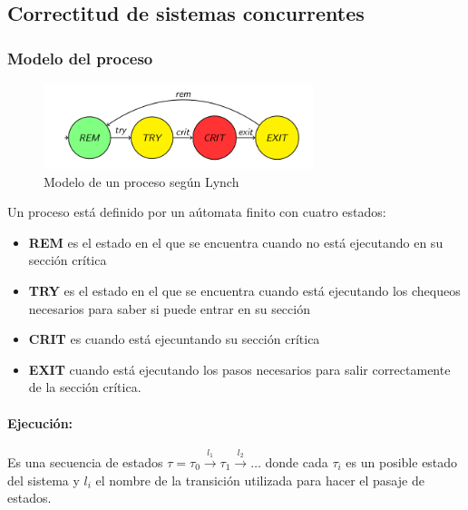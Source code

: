 \subsection{Correctitud de sistemas concurrentes}
\subsubsection{Modelo del proceso}

\begin{figure}[H]
	\centering
	\includegraphics[width=0.7\textwidth]{imagenes/modelo_proceso}
	\caption{Modelo de un proceso según Lynch}
	\label{fig:modeloproceso}
\end{figure}

Un proceso está definido por un aútomata finito con cuatro estados:
\begin{itemize}
	\item \textbf{REM} es el estado en el que se encuentra cuando no está ejecutando en su sección crítica
	\item \textbf{TRY} es el estado en el que se encuentra  cuando está ejecutando los chequeos necesarios para saber si puede entrar en su sección
	\item \textbf{CRIT} es cuando está ejecuntando su sección crítica
	\item \textbf{EXIT} cuando está ejecutando los pasos necesarios para salir correctamente de la sección crítica.
\end{itemize}

\paragraph{Ejecución:} Es una secuencia de estados $\tau = \tau_0 \overset{l_1}{\rightarrow} \tau_1 \overset{l_2}{\rightarrow}\dots$ donde cada $\tau_i$ es un posible estado del sistema y $l_i$ el nombre de la transición utilizada para hacer el pasaje de estados.


